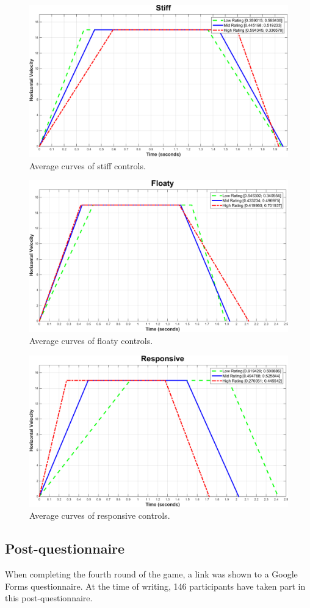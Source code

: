 \begin{figure}[htbp]
\centering
\includegraphics[width=\columnwidth]{Pics/Curves/Stiff_curve}
\caption{Average curves of stiff controls.}
\label{fig:curve_stiff}
\end{figure}

\begin{figure}[htbp]
\centering
\includegraphics[width=\columnwidth]{Pics/Curves/Floaty_curve}
\caption{Average curves of floaty controls.}
\label{fig:curve_floaty}
\end{figure}

\begin{figure}[htbp]
\centering
\includegraphics[width=\columnwidth]{Pics/Curves/Responsive_curve}
\caption{Average curves of responsive controls.}
\label{fig:curve_responsive}
\end{figure}

\subsection{Post-questionnaire}
When completing the fourth round of the game, a link was shown to a Google Forms questionnaire. At the time of writing, 146 participants have taken part in this post-questionnaire.